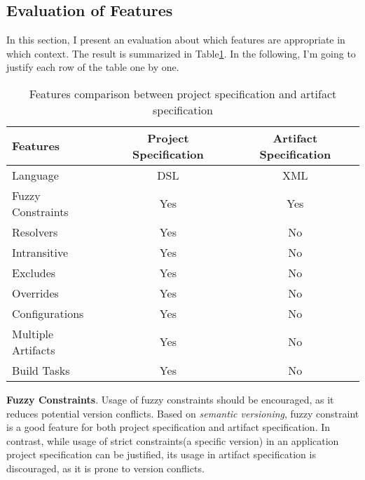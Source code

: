 \subsection{Evaluation of Features}

In this section, I present an evaluation about which features are appropriate in which context. The result is summarized in Table\ref{table:prag:features}. In the following, I'm going to justify each row of the table one by one.

\begin{table}
  \center
  \begin{tabular}{|l|c|c|}
    \hline
    Features              & Project Specification & Artifact Specification \\
    \hline
    Language              &   DSL                 & XML \\
    Fuzzy Constraints     &   Yes                 & Yes \\
    Resolvers             &   Yes                 & No \\
    Intransitive          &   Yes                 & No \\
    Excludes              &   Yes                 & No \\
    Overrides             &   Yes                 & No \\
    Configurations        &   Yes                 & No \\
    Multiple Artifacts    &   Yes                 & No \\
    Build Tasks           &   Yes                 & No \\
    \hline
  \end{tabular}
  \caption[Features Comparison]{Features comparison between project specification and artifact specification \label{table:prag:features}}
\end{table}

\textbf{Fuzzy Constraints}. Usage of fuzzy constraints should be encouraged, as it reduces potential version conflicts. Based on \emph{semantic versioning}, fuzzy constraint is a good feature for both project specification and artifact specification. In contrast, while usage of strict constraints(a specific version) in an application project specification can be justified, its usage in artifact specification is discouraged, as it is prone to version conflicts.


